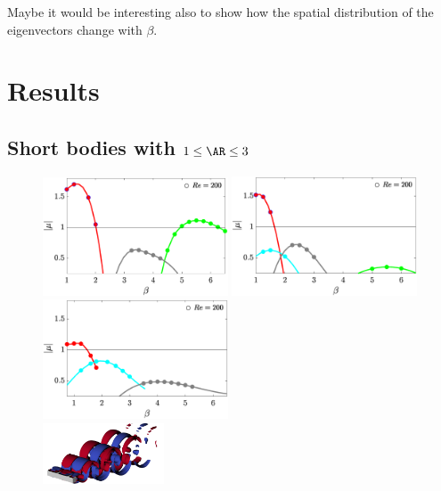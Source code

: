 \documentclass[onecolumn,notitlepage,superscriptaddress, amsmath,amssymb,longbibliographyaps,floatfix]{revtex4-1}
\begin{document}
Maybe it would be interesting also to show how the spatial distribution of the eigenvectors change with $\beta$.

\section{Results}

\subsection{Short bodies with $1 \le \AR \le 3$}

\begin{figure}
  \centering
  \includegraphics[width=0.49\textwidth]{./fig/AR1s/multipliers_AR1.eps}
  \includegraphics[width=0.49\textwidth]{./fig/AR1s/multipliers_AR1p25.eps}
  \includegraphics[width=0.49\textwidth]{./fig/AR1s/multipliers_AR1p5.eps} \\
  \includegraphics[width=0.32\textwidth]{./fig/AR1s/Floqetmode_beta_1p2_Re200_AR1_A.png}

\end{figure}
\end{document}
